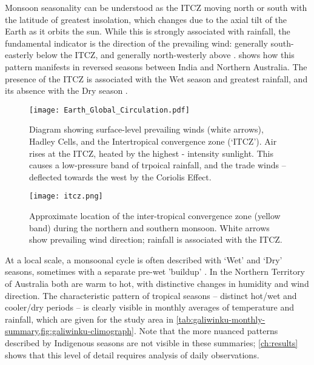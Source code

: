 Monsoon seasonality can be understood as the ITCZ moving north or south
with the latitude of greatest insolation, which changes due to the
axial tilt of the Earth as it orbits the sun.  While this is strongly
associated with rainfall, the fundamental indicator is the direction of
the prevailing wind: generally south-easterly below the ITCZ, and generally
north-westerly above \citep{kump2010}.   shows how this pattern
manifests in reversed seasons between India and Northern Australia.
The presence of the ITCZ is associated with the Wet season and greatest
rainfall, and its absence with the Dry season \citep{sturman2005}.

\begin{figure}[p]
    \centering
    \texttt{[image: Earth\_Global\_Circulation.pdf]}
    \caption[Hadley Cells and trade-winds]{
        Diagram showing surface-level prevailing winds (white arrows),
        Hadley Cells, and the Intertropical convergence zone (`ITCZ').
        Air rises at the ITCZ, heated by the highest - intensity sunlight.
        This causes a low-pressure band of trpoical rainfall, and the
        trade winds -- deflected towards the west by the Coriolis Effect.
        \citep[image:][]{kaidor2013}
        }
    \label{fig:hadley-cells}
\vspace{1cm}
    \texttt{[image: itcz.png]}
    \caption[ITCZ showing northern and southern monsoon]{
        Approximate location of the inter-tropical convergence zone
        (yellow band) during the northern and southern monsoon.
        White arrows show prevailing wind direction; rainfall is
        associated with the ITCZ.  \citep[image:][]{boos2014}}
    \label{fig:itcz-india-aus}
\end{figure}

At a local scale, a monsoonal cycle is often described with `Wet' and
`Dry' seasons, sometimes with a separate pre-wet 'buildup' \citep{kingsley2003}.
In the Northern Territory of Australia both are warm to hot, with distinctive
changes in humidity and wind direction.  The characteristic pattern of tropical
seasons -- distinct hot/wet and cooler/dry periods -- is clearly visible in
monthly averages of temperature and rainfall, which are given for the study
area in \cref{tab:galiwinku-monthly-summary,fig:galiwinku-climograph}.
Note that the more nuanced patterns described by Indigenous seasons are not
visible in these summaries; \cref{ch:results} shows that this level of detail
requires analysis of daily observations.



